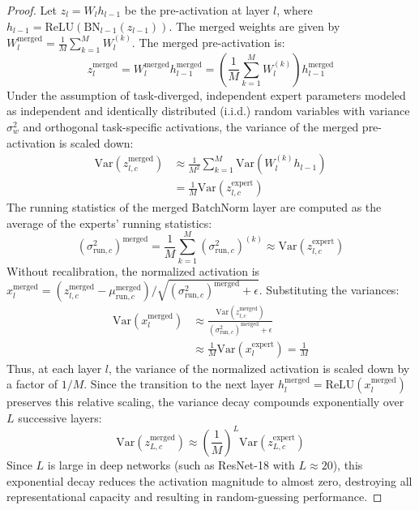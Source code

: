 \documentclass{article}
\theoremstyle{plain}
\theoremstyle{definition}
\theoremstyle{remark}
\begin{document}
\begin{proof}
Let $z_l = W_l h_{l-1}$ be the pre-activation at layer $l$, where $h_{l-1} = \text{ReLU}(\text{BN}_{l-1}(z_{l-1}))$. The merged weights are given by $W_l^{\text{merged}} = \frac{1}{M} \sum_{k=1}^M W_l^{(k)}$. The merged pre-activation is:
\begin{equation}
z_l^{\text{merged}} = W_l^{\text{merged}} h_{l-1}^{\text{merged}} = \left( \frac{1}{M} \sum_{k=1}^M W_l^{(k)} \right) h_{l-1}^{\text{merged}}
\end{equation}
Under the assumption of task-diverged, independent expert parameters modeled as independent and identically distributed (i.i.d.) random variables with variance $\sigma_w^2$ and orthogonal task-specific activations, the variance of the merged pre-activation is scaled down:
\begin{align}
\text{Var}(z_{l,c}^{\text{merged}}) &\approx \frac{1}{M^2}\sum_{k=1}^M \text{Var}(W_l^{(k)} h_{l-1}) \nonumber \\
&= \frac{1}{M} \text{Var}(z_{l,c}^{\text{expert}})
\end{align}
The running statistics of the merged BatchNorm layer are computed as the average of the experts' running statistics:
\begin{equation}
(\sigma^2_{\text{run}, c})^{\text{merged}} = \frac{1}{M}\sum_{k=1}^M (\sigma^2_{\text{run}, c})^{(k)} \approx \text{Var}(z_{l,c}^{\text{expert}})
\end{equation}
Without recalibration, the normalized activation is $x_l^{\text{merged}} = (z_{l,c}^{\text{merged}} - \mu_{\text{run}, c}^{\text{merged}}) / \sqrt{(\sigma_{\text{run}, c}^2)^{\text{merged}} + \epsilon}$. Substituting the variances:
\begin{align}
\text{Var}(x_l^{\text{merged}}) &\approx \frac{\text{Var}(z_{l,c}^{\text{merged}})}{(\sigma_{\text{run}, c}^2)^{\text{merged}} + \epsilon} \nonumber \\
&\approx \frac{1}{M} \text{Var}(x_l^{\text{expert}}) = \frac{1}{M}
\end{align}
Thus, at each layer $l$, the variance of the normalized activation is scaled down by a factor of $1/M$. Since the transition to the next layer $h_l^{\text{merged}} = \text{ReLU}(x_l^{\text{merged}})$ preserves this relative scaling, the variance decay compounds exponentially over $L$ successive layers:
\begin{equation}
\text{Var}(z_{L,c}^{\text{merged}}) \approx \left( \frac{1}{M} \right)^L \text{Var}(z_{L,c}^{\text{expert}})
\end{equation}
Since $L$ is large in deep networks (such as ResNet-18 with $L \approx 20$), this exponential decay reduces the activation magnitude to almost zero, destroying all representational capacity and resulting in random-guessing performance.
\end{proof}
\end{document}
